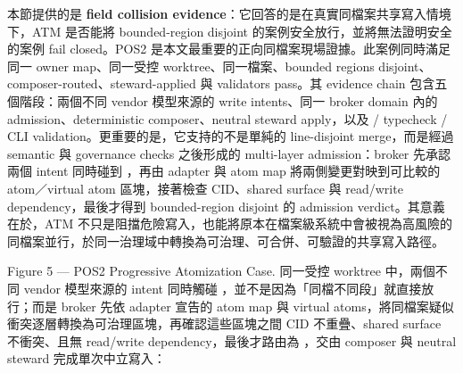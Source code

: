 \documentclass[a4paper,fontset=none]{ctexart}
\begin{document}
本節提供的是 \textbf{field collision evidence}：它回答的是在真實同檔案共享寫入情境下，ATM 是否能將 bounded-region disjoint 的案例安全放行，並將無法證明安全的案例 fail closed。POS2 是本文最重要的正向同檔案現場證據。此案例同時滿足同一 owner map、同一受控 worktree、同一檔案、bounded regions disjoint、composer-routed、steward-applied 與 validators pass。其 evidence chain 包含五個階段：兩個不同 vendor 模型來源的 write intents、同一 broker domain 內的 admission、deterministic composer、neutral steward apply，以及 \texttt{} / typecheck / CLI validation。更重要的是，它支持的不是單純的 line-disjoint merge，而是經過 semantic 與 governance checks 之後形成的 multi-layer admission：broker 先承認兩個 intent 同時碰到 \texttt{}，再由 adapter 與 atom map 將兩側變更對映到可比較的 atom／virtual atom 區塊，接著檢查 CID、shared surface 與 read/write dependency，最後才得到 bounded-region disjoint 的 admission verdict。其意義在於，ATM 不只是阻擋危險寫入，也能將原本在檔案級系統中會被視為高風險的同檔案並行，於同一治理域中轉換為可治理、可合併、可驗證的共享寫入路徑。

Figure 5 --- POS2 Progressive Atomization Case. 同一受控 worktree 中，兩個不同 vendor 模型來源的 intent 同時觸碰 \texttt{}，並不是因為「同檔不同段」就直接放行；而是 broker 先依 adapter 宣告的 atom map 與 virtual atoms，將同檔案疑似衝突逐層轉換為可治理區塊，再確認這些區塊之間 CID 不重疊、shared surface 不衝突、且無 read/write dependency，最後才路由為 \texttt{}，交由 composer 與 neutral steward 完成單次中立寫入：
\end{document}
